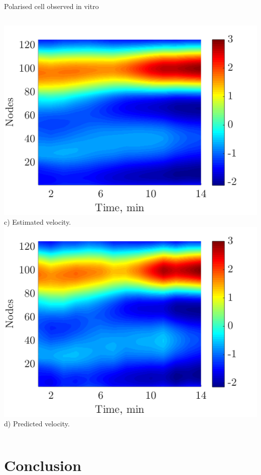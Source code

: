 \documentclass[mathserif,11pt]{beamer}
\begin{document}
\begin{frame}{Polarised cell observed in vitro}
\begin{columns}
\begin{column}{0.5\textwidth}
	\includegraphics[scale=0.3]{Figures/polarised_estimated_velocity.png}\vfil
	\footnotesize{c) Estimated velocity.}
	\vfil
	\includegraphics[scale=0.3]{Figures/polarised_modelled_velocity.png}\vfil
	\footnotesize{d) Predicted velocity.}
\end{column}
\end{columns}
\end{frame}



\section{Conclusion}
\end{document}
